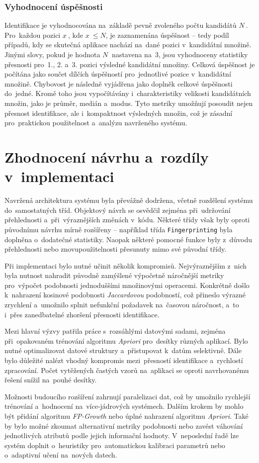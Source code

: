 \subsubsection{Vyhodnocení úspěšnosti}

Identifikace je vyhodnocována na~základě pevně zvoleného počtu kandidátů \( N~\). Pro~každou pozici \( x~\), kde \( x~\leq N\), je zaznamenána úspěšnost -- tedy podíl případů, kdy se skutečná aplikace nachází na~dané pozici v~kandidátní množině. Jinými slovy, pokud je hodnota \( N~\) nastavena na~3, jsou vyhodnoceny statistiky přesnosti pro~1., 2. a~3. pozici výsledné kandidátní množiny. Celková úspěšnost je počítána jako součet dílčích úspěšností pro~jednotlivé pozice v~kandidátní množině. Chybovost je následně vyjádřena jako doplněk celkové úspěšnosti do~jedné. Kromě toho jsou vypočítávány i~charakteristiky velikosti kandidátních množin, jako je průměr, medián a~modus. Tyto metriky umožňují posoudit nejen přesnost identifikace, ale i~kompaktnost výsledných množin, což je zásadní pro~praktickou použitelnost a~analýzu navrženého systému.

\section{Zhodnocení návrhu a~rozdíly v~implementaci}


Navržená architektura systému byla převážně dodržena, včetně rozdělení systému do~samostatných tříd. Objektový návrh se osvědčil zejména při~udržování přehlednosti a~při~výraznějších změnách v~kódu. Některé třídy však byly oproti původnímu návrhu mírně rozšířeny – například třída \texttt{Fingerprinting} byla doplněna o~dodatečné statistiky. Naopak některé pomocné funkce byly z~důvodu přehlednosti nebo znovupoužitelnosti přesunuty mimo své původní třídy.

Při implementaci bylo nutné učinit několik kompromisů. Nejvýraznějším z~nich byla nutnost nahradit původně zamýšlené výpočetně náročnější metriky pro~výpočet podobnosti jednoduššími množinovými operacemi. Konkrétně došlo k~nahrazení kosinové podobnosti \textit{Jaccardovou} podobností, což přineslo výrazné zrychlení a~umožnilo splnit nefunkční požadavek na~časovou náročnost, a~to i~přes zanedbatelné zhoršení přesnosti identifikace.

Mezi hlavní výzvy patřila práce s~rozsáhlými datovými sadami, zejména při~opakovaném trénování algoritmu \textit{Apriori} pro~desítky různých aplikací. Bylo nutné optimalizovat datové struktury a~přistupovat k~datům selektivně. Dále bylo důležité nalézt vhodný kompromis mezi~přesností identifikace a~rychlostí zpracování. Počet vytěžených častých vzorů na~aplikaci se oproti navrhovanému řešení snížil na~pouhé desítky.

Možnosti budoucího rozšíření zahrnují paralelizaci dat, což by umožnilo rychlejší trénování a~hodnocení na~více-jádrových systémech. Dalším krokem by mohlo být přidání algoritmu \textit{FP-Growth} nebo úplné nahrazení algoritmu \textit{Apriori}. Také by bylo možné zkoumat alternativní metriky podobnosti nebo zavést váhování jednotlivých atributů podle jejich informační hodnoty. V~neposlední řadě lze systém doplnit o~heuristiky pro~automatickou kalibraci parametrů nebo o~adaptivní učení na~nových datech.
